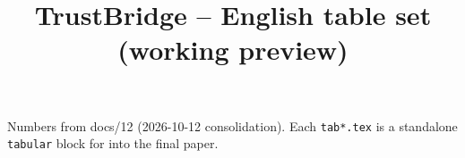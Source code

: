 \documentclass[11pt]{article}
\begin{document}
\title{TrustBridge -- English table set (working preview)}
\maketitle
Numbers from docs/12 (2026-10-12 consolidation). Each \texttt{tab*.tex} is a
standalone \texttt{tabular} block for \verb|| into the final paper.


\clearpage


\clearpage

\clearpage


\end{document}
